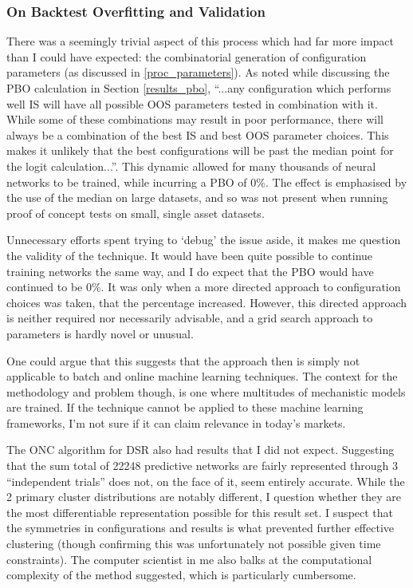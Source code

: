 \documentclass[a4paper,11pt,oneside]{article}
\theoremstyle{plain}
\theoremstyle{definition}
\begin{document}
	\subsubsection{On Backtest Overfitting and Validation}
	
	There was a seemingly trivial aspect of this process which had far more impact than I could have expected: the combinatorial generation of configuration parameters (as discussed in \ref{proc_parameters}). As noted while discussing the PBO calculation in Section \ref{results_pbo}, ``...any configuration which performs well IS will have all possible OOS parameters tested in combination with it. While some of these combinations may result in poor performance, there will always be a combination of the best IS and best OOS parameter choices. This makes it unlikely that the best configurations will be past the median point for the logit calculation...''. This dynamic allowed for many thousands of neural networks to be trained, while incurring a PBO of 0\%. The effect is emphasised by the use of the median on large datasets, and so was not present when running proof of concept tests on small, single asset datasets. \newline
	
	Unnecessary efforts spent trying to `debug' the issue aside, it makes me question the validity of the technique. It would have been quite possible to continue training networks the same way, and I do expect that the PBO would have continued to be 0\%. It was only when a more directed approach to configuration choices was taken, that the percentage increased. However, this directed approach is neither required nor necessarily advisable, and a grid search approach to parameters is hardly novel or unusual. \newline
	
	One could argue that this suggests that the approach then is simply not applicable to batch and online machine learning techniques. The context for the methodology and problem though, is one where multitudes of mechanistic models are trained. If the technique cannot be applied to these machine learning frameworks, I'm not sure if it can claim relevance in today's markets.\newline
	
	The ONC algorithm for DSR also had results that I did not expect. Suggesting that the sum total of 22248 predictive networks are fairly represented through 3 ``independent trials'' does not, on the face of it, seem entirely accurate. While the 2 primary cluster distributions are notably different, I question whether they are the most differentiable representation possible for this result set. I suspect that the symmetries in configurations and results is what prevented further effective clustering (though confirming this was unfortunately not possible given time constraints). The computer scientist in me also balks at the computational complexity of the method suggested, which is particularly cumbersome. \newline
	
\end{document}
